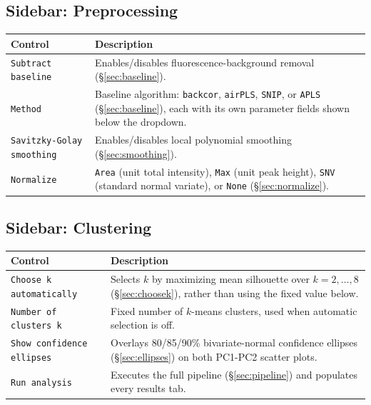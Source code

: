\documentclass[11pt,a4paper]{article}
\makeatletter
\newcommand{\code}[1]{\texttt{#1}}
\newenvironment{argtabletwo}[4]{%
  \begin{center}
  \renewcommand{\arraystretch}{1.25}
  \setlength{\dimen2}{\dimexpr\textwidth-#3-4\tabcolsep-2\arrayrulewidth\relax}
  \begin{tabular}{@{}p{#3}p{\dimen2}@{}}
  \toprule
  \textbf{#1} & \textbf{#2} \\
  \midrule
}{%
  \bottomrule
  \end{tabular}
  \end{center}
}
\makeatother
\begin{document}
\subsection{Sidebar: Preprocessing}
\begin{argtabletwo}{Control}{Description}{3.2cm}{X}
\code{Subtract baseline} & Enables/disables fluorescence-background
removal (\S\ref{sec:baseline}). \\
\code{Method} & Baseline algorithm: \code{backcor}, \code{airPLS},
\code{SNIP}, or \code{APLS} (\S\ref{sec:baseline}), each with its own
parameter fields shown below the dropdown. \\
\code{Savitzky-Golay smoothing} & Enables/disables local polynomial
smoothing (\S\ref{sec:smoothing}). \\
\code{Normalize} & \code{Area} (unit total intensity), \code{Max} (unit
peak height), \code{SNV} (standard normal variate), or \code{None}
(\S\ref{sec:normalize}). \\
\end{argtabletwo}

\subsection{Sidebar: Clustering}
\begin{argtabletwo}{Control}{Description}{3.2cm}{X}
\code{Choose k automatically} & Selects $k$ by maximizing mean silhouette
over $k=2,\dots,8$ (\S\ref{sec:choosek}), rather than using the fixed value
below. \\
\code{Number of clusters k} & Fixed number of $k$-means clusters, used
when automatic selection is off. \\
\code{Show confidence ellipses} & Overlays 80/85/90\% bivariate-normal
confidence ellipses (\S\ref{sec:ellipses}) on both PC1-PC2 scatter plots. \\
\code{Run analysis} & Executes the full pipeline (\S\ref{sec:pipeline})
and populates every results tab. \\
\end{argtabletwo}

\end{document}
